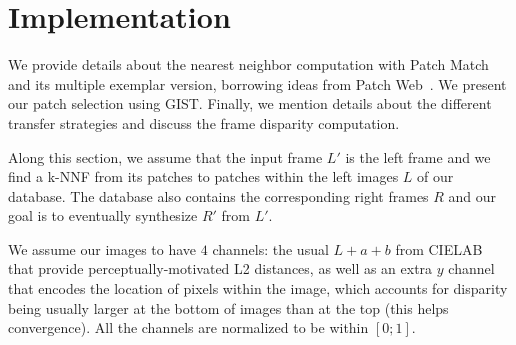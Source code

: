 
\section{Implementation}

We provide details about the nearest neighbor computation with Patch Match~\cite{Barnes09} and its multiple exemplar version, borrowing ideas from Patch Web~\cite{Barnes11}. We present our patch selection using GIST.
Finally, we mention details about the different transfer strategies and discuss the frame disparity computation.

Along this section, we assume that the input frame $L'$ is the left frame and we find a k-NNF from its patches to patches within the left images $L$ of our database.
The database also contains the corresponding right frames $R$ and our goal is to eventually synthesize $R'$ from $L'$.

We assume our images to have $4$ channels: the usual $L+a+b$ from CIELAB that provide perceptually-motivated L2 distances, as well as an extra $y$ channel that encodes the location of pixels within the image, which accounts for disparity being usually larger at the bottom of images than at the top (this helps convergence).
All the channels are normalized to be within $[0;1]$.



